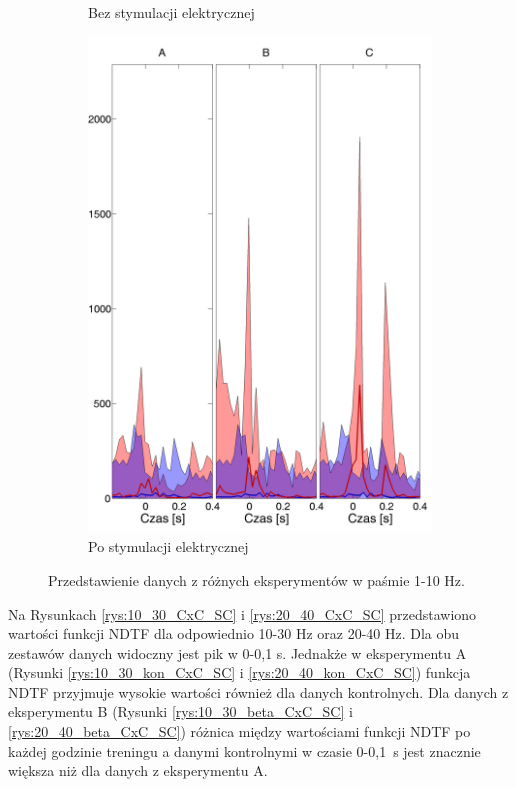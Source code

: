 \documentclass{pracamgr}
\begin{document}
\begin{figure}[h]
\begin{subfigure}{.5\textwidth}
			\caption{Bez stymulacji elektrycznej}
			\label{rys:1_10_kon_CxC_SC}
		\end{subfigure}%
		\begin{subfigure}{.5\textwidth}
			\centering
			\includegraphics[width=1.\linewidth]{beta3_1-10_z_CxC5_do_SC42.png}
			\caption{Po stymulacji elektrycznej}
			\label{rys:1_10_beta_CxC_SC}
		\end{subfigure}
		\caption{Przedstawienie danych z różnych eksperymentów w paśmie 1-10 Hz.}
		\label{rys:1_10_CxC_SC}
	\end{figure}
	\FloatBarrier
	Na Rysunkach \ref{rys:10_30_CxC_SC} i \ref{rys:20_40_CxC_SC} przedstawiono wartości funkcji NDTF dla odpowiednio 10-30 Hz oraz 20-40 Hz. Dla obu zestawów danych widoczny jest pik w 0-0,1 s. Jednakże w eksperymentu A (Rysunki \ref{rys:10_30_kon_CxC_SC} i \ref{rys:20_40_kon_CxC_SC}) funkcja NDTF przyjmuje wysokie wartości również dla danych kontrolnych. Dla danych z eksperymentu B (Rysunki \ref{rys:10_30_beta_CxC_SC} i \ref{rys:20_40_beta_CxC_SC}) różnica między wartościami funkcji NDTF po każdej godzinie treningu a danymi kontrolnymi w czasie 0-0,1~s jest znacznie większa niż dla danych z eksperymentu A.
\end{document}
